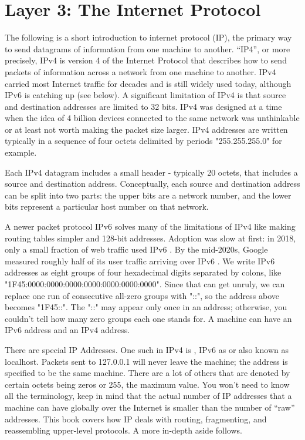 \section{Layer 3: The Internet Protocol}

The following is a short introduction to internet protocol (IP), the primary way to send datagrams of information from one machine to another.
``IP4'', or more precisely, IPv4 is version 4 of the Internet Protocol that describes how to send packets of information across a network from one machine to another.
IPv4 carried most Internet traffic for decades and is still widely used today, although IPv6 is catching up (see below).
A significant limitation of IPv4 is that source and destination addresses are limited to 32 bits.
IPv4 was designed at a time when the idea of 4 billion devices connected to the same network was unthinkable or at least not worth making the packet size larger.
IPv4 addresses are written typically in a sequence of four octets delimited by periods "255.255.255.0" for example.

Each IPv4 datagram includes a small header - typically 20 octets, that includes a source and destination address.
Conceptually, each source and destination address can be split into two parts: the upper bits are a network number, and the lower bits represent a particular host number on that network.

A newer packet protocol IPv6 solves many of the limitations of IPv4 like making routing tables simpler and 128-bit addresses.
Adoption was slow at first: in 2018, only a small fraction of web traffic used IPv6 \cite{internet_society_2018}.
By the mid-2020s, Google measured roughly half of its user traffic arriving over IPv6 \cite{google_ipv6_stats}.
We write IPv6 addresses as eight groups of four hexadecimal digits separated by colons, like "1F45:0000:0000:0000:0000:0000:0000:0000".
Since that can get unruly, we can replace one run of consecutive all-zero groups with "::", so the address above becomes "1F45::".
The "::" may appear only once in an address; otherwise, you couldn't tell how many zero groups each one stands for.
A machine can have an IPv6 address and an IPv4 address.

There are special IP Addresses.
One such in IPv4 is , IPv6 as  or  also known as localhost.
Packets sent to 127.0.0.1 will never leave the machine; the address is specified to be the same machine.
There are a lot of others that are denoted by certain octets being zeros or 255, the maximum value. You won't need to know all the terminology, keep in mind that the actual number of IP addresses that a machine can have globally over the Internet is smaller than the number of ``raw'' addresses.
This book covers how IP deals with routing, fragmenting, and reassembling upper-level protocols. A more in-depth aside follows.

